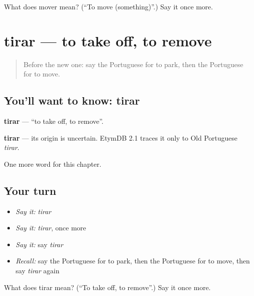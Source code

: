 \begin{tcolorbox}[breakable,colback=teal!4,colframe=teal!35!black,title={Before you move on}]
What does mover mean? (\textquotedblleft{}To move (something)\textquotedblright{}.) Say it once more.
\end{tcolorbox}
\section[tirar]{tirar — to take off, to remove}

\label{lesson:PT-C172-tirar}



\begin{quote}
Before the new one: say the Portuguese for to park, then the Portuguese for to move.
\end{quote}

\subsection*{You'll want to know: tirar}
\textbf{tirar} — \textquotedblleft{}to take off, to remove\textquotedblright{}.

\begin{cousinweb}
\textbf{tirar} — its origin is uncertain. EtymDB 2.1 traces it only to Old Portuguese \emph{tirar}.
\end{cousinweb}

\begin{grammarlens}[title={What you've built}]
One more word for this chapter.
\end{grammarlens}

\subsection*{Your turn}
\begin{itemize}
\raggedright
  \item \emph{Say it:} \emph{tirar}
  \item \emph{Say it:} \emph{tirar}, once more
  \item \emph{Say it:} say \emph{tirar}
  \item \emph{Recall:} say the Portuguese for to park, then the Portuguese for to move, then say \emph{tirar} again
\end{itemize}

\begin{tcolorbox}[breakable,colback=teal!4,colframe=teal!35!black,title={Before you move on}]
What does tirar mean? (\textquotedblleft{}To take off, to remove\textquotedblright{}.) Say it once more.
\end{tcolorbox}
